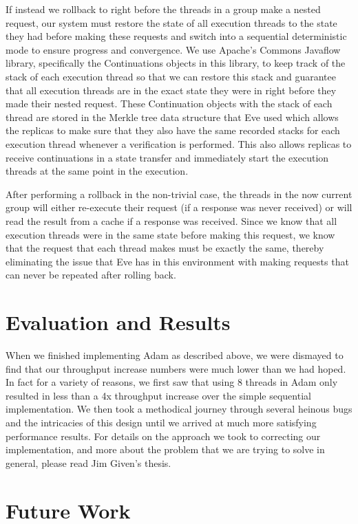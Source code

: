 \documentclass[11pt, oneside]{report}
\begin{document}
If instead we rollback to right before the threads in a group make a nested request, our system must restore the state of all execution threads to the state they had before making these requests and switch into a sequential deterministic mode to ensure progress and convergence. We use Apache's Commons Javaflow library, specifically the Continuations objects in this library, to keep track of the stack of each execution thread so that we can restore this stack and guarantee that all execution threads are in the exact state they were in right before they made their nested request. These Continuation objects with the stack of each thread are stored in the Merkle tree data structure that Eve used which allows the replicas to make sure that they also have the same recorded stacks for each execution thread whenever a verification is performed. This also allows replicas to receive continuations in a state transfer and immediately start the execution threads at the same point in the execution. 

After performing a rollback in the non-trivial case, the threads in the now current group will either re-execute their request (if a response was never received) or will read the result from a cache if a response was received. Since we know that all execution threads were in the same state before making this request, we know that the request that each thread makes must be exactly the same, thereby eliminating the issue that Eve has in this environment with making requests that can never be repeated after rolling back.

\section{Evaluation and Results}

When we finished implementing Adam as described above, we were dismayed to find that our throughput increase numbers were much lower than we had hoped. In fact for a variety of reasons, we first saw that using 8 threads in Adam only resulted in less than a 4x throughput increase over the simple sequential implementation. We then took a methodical journey through several heinous bugs and the intricacies of this design until we arrived at much more satisfying performance results. For details on the approach we took to correcting our implementation, and more about the problem that we are trying to solve in general, please read Jim Given's thesis.

\section{Future Work}
\end{document}
